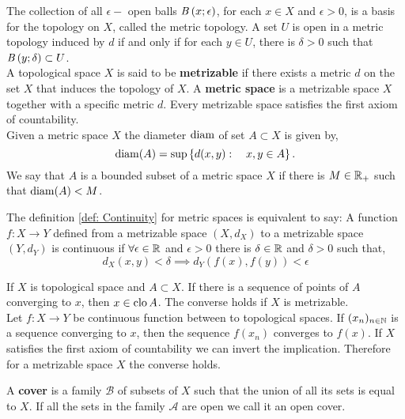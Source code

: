 The collection of all $\epsilon-$ open balls $\mathit{B}\left( x; \epsilon \right)$, for each $x\in X$ and $\epsilon>0$, is a basis for the topology on $X$, called the metric topology. A set $U$ is open in a metric topology induced by $d$ if and only if for each $y\in U$, there is $\delta>0$ such that $\mathit{B}\left( y; \delta \right)\subset U$.\\

A topological space $X$ is said to be \textbf{metrizable} if there exists a metric $d$ on the set $X$ that induces the topology of $X$. A \textbf{metric space} is a metrizable space $X$ together with a specific metric $d$. Every metrizable space satisfies the first axiom of countability.\\

Given a metric space $X$ the diameter $\mathrm{diam}$ of set $A\subset X$ is given by,
\begin{equation*}
	\mathrm{diam}(A)=\sup\left\lbrace d(x,y): \quad x, y \in A \right\rbrace.
\end{equation*} 
We say that $A$ is a bounded subset of a metric space $X$ if there is $M\in \mathbb{R}_+$ such that $\mathrm{diam}(A)<M$.

\begin{definition}
	The definition \ref{def: Continuity} for metric spaces is equivalent to say: A function $f:X\rightarrow Y$ defined from a metrizable space $(X, d_X)$ to a metrizable space $(Y, d_Y)$ is continuous if $\forall \epsilon\in\mathbb{R}$ and $\epsilon>0$ there is $\delta \in \mathbb{R}$ and $\delta>0$ such that,
	\begin{equation*}
		d_X(x, y)<\delta \implies d_Y(f(x),f(y))<\epsilon
	\end{equation*}
\end{definition}
If $X$ is topological space and $A\subset X$. If there is a sequence of points of $A$ converging to $x$, then $x\in\mathrm{clo}\, A$. The converse holds if $X$ is metrizable. \\

Let $f: X\rightarrow Y$ be continuous function between to topological spaces. If $(x_n)_{n\in \mathbb{N}}$ is a sequence converging to $x$, then the sequence $f(x_n)$ converges to $f(x)$. If $X$ satisfies the first axiom of countability we can invert the implication. Therefore for a metrizable space $X$ the converse holds. 



A \textbf{ cover} is a family $\mathcal B$ of subsets of $X$ such that the union of all its sets is equal to $X$. If all the sets in the family $\mathcal A$ are open we call it an open cover. 

